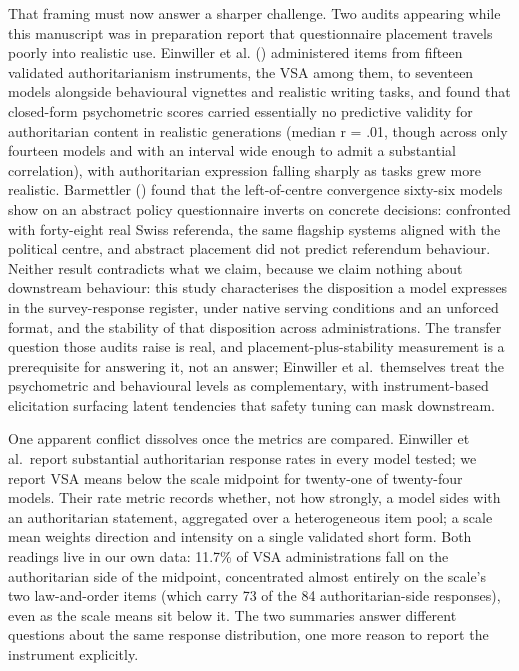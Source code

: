 \documentclass[
]{article}
\begin{document}
That framing must now answer a sharper challenge. Two audits appearing
while this manuscript was in preparation report that questionnaire
placement travels poorly into realistic use. Einwiller et al.
() administered items from fifteen
validated authoritarianism instruments, the VSA among them, to seventeen
models alongside behavioural vignettes and realistic writing tasks, and
found that closed-form psychometric scores carried essentially no
predictive validity for authoritarian content in realistic generations
(median r = .01, though across only fourteen models and with an interval
wide enough to admit a substantial correlation), with authoritarian
expression falling sharply as tasks grew more realistic. Barmettler
() found that the left-of-centre
convergence sixty-six models show on an abstract policy questionnaire
inverts on concrete decisions: confronted with forty-eight real Swiss
referenda, the same flagship systems aligned with the political centre,
and abstract placement did not predict referendum behaviour. Neither
result contradicts what we claim, because we claim nothing about
downstream behaviour: this study characterises the disposition a model
expresses in the survey-response register, under native serving
conditions and an unforced format, and the stability of that disposition
across administrations. The transfer question those audits raise is
real, and placement-plus-stability measurement is a prerequisite for
answering it, not an answer; Einwiller et al.~themselves treat the
psychometric and behavioural levels as complementary, with
instrument-based elicitation surfacing latent tendencies that safety
tuning can mask downstream.

One apparent conflict dissolves once the metrics are compared. Einwiller
et al.~report substantial authoritarian response rates in every model
tested; we report VSA means below the scale midpoint for twenty-one of
twenty-four models. Their rate metric records whether, not how strongly,
a model sides with an authoritarian statement, aggregated over a
heterogeneous item pool; a scale mean weights direction and intensity on
a single validated short form. Both readings live in our own data:
11.7\% of VSA administrations fall on the authoritarian side of the
midpoint, concentrated almost entirely on the scale's two law-and-order
items (which carry 73 of the 84 authoritarian-side responses), even as
the scale means sit below it. The two summaries answer different
questions about the same response distribution, one more reason to
report the instrument explicitly.
\end{document}

